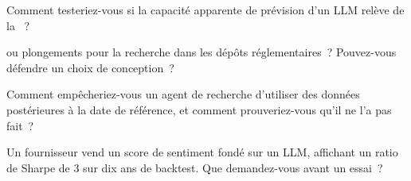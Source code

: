 \begin{interviewq}\label{iq:ml:large-language-models-in-finance:3}
Comment testeriez-vous si la capacité apparente de prévision d'un LLM relève de la ~?
\end{interviewq}

\begin{interviewq}\label{iq:ml:large-language-models-in-finance:4}
 ou plongements pour la recherche dans les dépôts réglementaires~? Pouvez-vous défendre un choix de conception~?
\end{interviewq}

\begin{interviewq}\label{iq:ml:large-language-models-in-finance:5}
Comment empêcheriez-vous un agent de recherche d'utiliser des données postérieures à la date de référence, et comment prouveriez-vous qu'il ne l'a pas fait~?
\end{interviewq}

\begin{interviewq}\label{iq:ml:large-language-models-in-finance:6}
Un fournisseur vend un score de sentiment fondé sur un LLM, affichant un ratio de Sharpe de 3 sur dix ans de backtest. Que demandez-vous avant un essai~?
\end{interviewq}

